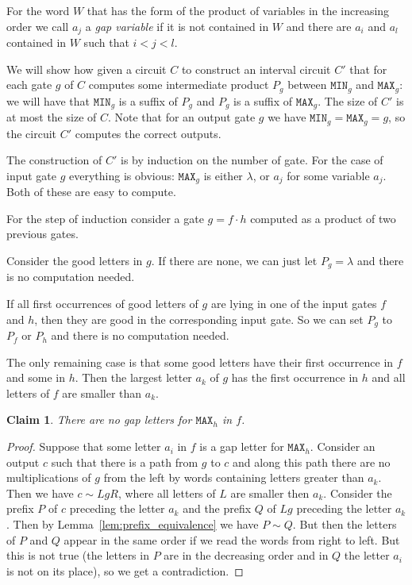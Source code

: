 \documentclass[11pt,letterpaper]{article}
\newtheorem{claim}{Claim}
\newcommand{\mmin}{\texttt{MIN}}
\newcommand{\mmax}{\texttt{MAX}}
\begin{document}
For the word $W$ that has the form of the product of variables in the increasing order we call $a_j$ a \emph{gap variable} if it is not contained in $W$ and there are $a_i$ and $a_l$ contained in $W$ such that $i<j<l$.

We will show how given a circuit $C$ to construct an interval circuit $C'$ that for each gate $g$ of $C$ computes some intermediate product $P_g$ between $\mmin_g$ and $\mmax_g$: we will have that $\mmin_g$ is a suffix of $P_g$ and $P_g$ is a suffix of $\mmax_g$. The size of $C'$ is at most the size of $C$.
Note that for an output gate $g$ we have $\mmin_g=\mmax_g=g$, so the circuit $C'$ computes the correct outputs.

The construction of $C'$ is by induction on the number of gate. For the case of input gate $g$ everything is obvious: $\mmax_g$ is either $\lambda$, or $a_j$ for some variable $a_j$. Both of these are easy to compute.

For the step of induction consider a gate $g=f\cdot h$ computed as a product of two previous gates.

Consider the good letters in $g$. If there are none, we can just let $P_g=\lambda$ and there is no computation needed.

If all first occurrences of good letters of $g$ are lying in one of the input gates $f$ and $h$, then they are good in the corresponding input gate. So we can set $P_g$ to $P_f$ or $P_h$ and there is no computation needed.

The only remaining case is that some good letters have their first occurrence in $f$ and some in $h$. Then the largest letter $a_k$ of $g$ has the first occurrence in $h$ and all letters of $f$ are smaller than $a_k$.

\begin{claim} \label{cl: h is good}
There are no gap letters for $\mmax_h$ in $f$.
\end{claim}

\begin{proof}
Suppose that some letter $a_i$ in $f$ is a gap letter for $\mmax_h$. Consider an output $c$ such that there is a path from $g$ to $c$ and along this path there are no multiplications of $g$ from the left by words containing letters greater than $a_k$. Then we have $c \sim LgR$, where all letters of $L$ are smaller then $a_k$. Consider the prefix $P$ of $c$ preceding the letter $a_k$ and the prefix $Q$ of $Lg$ preceding the letter $a_k$.
Then by Lemma~\ref{lem:prefix_equivalence} we have $P \sim Q$. But then the letters of $P$ and $Q$ appear in the same order if we read the words from right to left. But this is not true (the letters in $P$ are in the decreasing order and in $Q$ the letter $a_i$ is not on its place), so we get a contradiction.
\end{proof}
\end{document}

